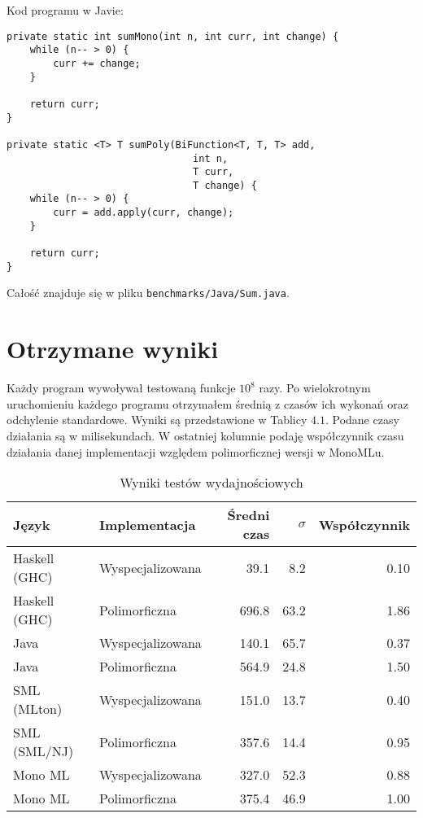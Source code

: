 \documentclass[declaration,shortabstract]{iithesis}
\begin{document}
Kod programu w Javie: 
\begin{lstlisting}[frame=lines]
private static int sumMono(int n, int curr, int change) {
    while (n-- > 0) {
        curr += change;
    }

    return curr;
}

private static <T> T sumPoly(BiFunction<T, T, T> add, 
                                int n, 
                                T curr, 
                                T change) {
    while (n-- > 0) {
        curr = add.apply(curr, change);
    }

    return curr;
}
\end{lstlisting}
Całość znajduje się w pliku \texttt{benchmarks/Java/Sum.java}.



\section{Otrzymane wyniki}

Każdy program wywoływał testowaną funkcje $10^8$ razy.
Po wielokrotnym uruchomieniu każdego programu otrzymałem średnią z czasów ich 
wykonań oraz odchylenie standardowe. Wyniki są przedstawione w Tablicy $4.1$.
Podane czasy działania są w milisekundach.
W ostatniej kolumnie podaję współczynnik czasu działania danej implementacji 
względem polimorficznej wersji w MonoMLu.

\begin{center}
\begin{table}
\caption{Wyniki testów wydajnościowych}
\begin{tabular}{|| l | l | r | r | r ||} 

 \hline
 Język & Implementacja & Średni czas & $\sigma$ & Współczynnik \\ 
 \hline\hline
 Haskell (GHC)        & Wyspecjalizowana & 39.1  & 8.2  & 0.10 \\ 
 Haskell (GHC)        & Polimorficzna    & 696.8 & 63.2 & 1.86 \\ 
 Java                 & Wyspecjalizowana & 140.1 & 65.7 & 0.37 \\ 
 Java                 & Polimorficzna    & 564.9 & 24.8 & 1.50 \\ 
 SML (MLton)  & Wyspecjalizowana & 151.0 & 13.7 & 0.40 \\ 
 SML (SML/NJ) & Polimorficzna    & 357.6 & 14.4 & 0.95 \\ 
 Mono ML              & Wyspecjalizowana & 327.0 & 52.3 & 0.88 \\ 
 Mono ML              & Polimorficzna    & 375.4 & 46.9 & 1.00 \\ 
 \hline
\end{tabular}
\end{table}
\end{center}
\end{document}
